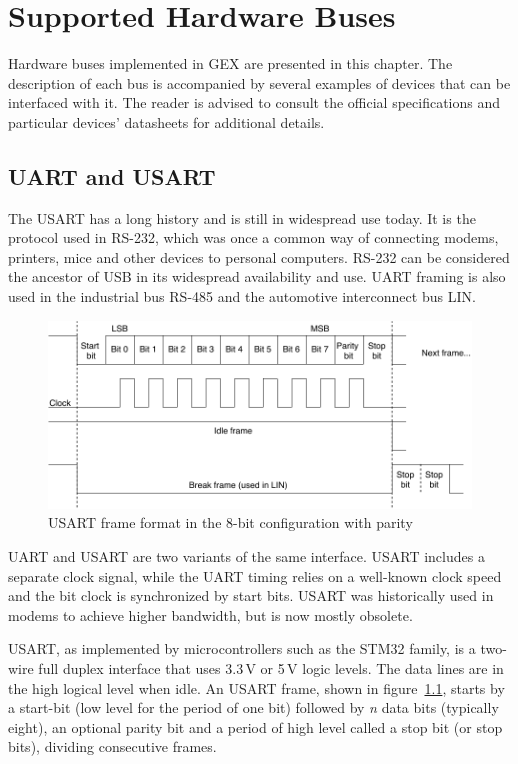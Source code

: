 \chapter{Supported Hardware Buses} \label{ch:hw_buses}

Hardware buses implemented in GEX are presented in this chapter. The description of each bus is accompanied by several examples of devices that can be interfaced with it. The reader is advised to consult the official specifications and particular devices' datasheets for additional details.

\section{UART and USART} \label{sec:theory-usart}

The \acrfull{USART} has a long history and is still in widespread use today. It is the protocol used in RS-232, which was once a common way of connecting modems, printers, mice and other devices to personal computers. RS-232 can be considered the ancestor of \gls{USB} in its widespread availability and use. \gls{UART} framing is also used in the industrial bus RS-485 and the automotive interconnect bus \gls{LIN}.

\begin{figure}[h]
	\centering
	\includegraphics[scale=.9] {img/uart-frame-redraw.pdf}
	\caption[UART frame format]{\label{fig:uart-frame}\gls{USART} frame format in the 8-bit configuration with parity}
\end{figure}

\gls{UART} and \gls{USART} are two variants of the same interface. \gls{USART} includes a separate clock signal, while the \gls{UART} timing relies on a well-known clock speed and the bit clock is synchronized by start bits. \gls{USART} was historically used in modems to achieve higher bandwidth, but is now mostly obsolete.

\gls{USART}, as implemented by microcontrollers such as the STM32 family, is a two-wire full duplex interface that uses 3.3\,V or 5\,V logic levels. The data lines are in the high logical level when idle. An \gls{USART} frame, shown in figure~\ref{fig:uart-frame}, starts by a start-bit (low level for the period of one bit) followed by \textit{n} data bits (typically eight), an optional parity bit and a period of high level called a stop bit (or stop bits), dividing consecutive frames.

